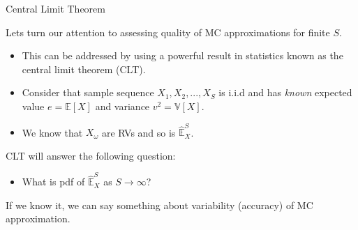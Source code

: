 \documentclass[9pt]{beamer}
\begin{document}
%
\begin{frame}{Central Limit Theorem}

Lets turn our attention to assessing quality of MC approximations for finite $S$. 
\begin{itemize}
\setlength{\itemsep}{10pt}
\item This can be addressed by using a powerful result in statistics known as the central limit theorem (CLT). 
\item Consider that sample sequence $X_1,X_2,...,X_S$ is i.i.d and has {\em known} expected value $e=\mathbb{E}[X]$ and variance $v^2=\mathbb{V}[X]$. 

\item We know that $X_\omega$ are RVs and so is $\hat{\mathbb{E}}_X^S$. 
\end{itemize}

CLT will answer the following question:
\begin{block}{}
\begin{itemize}
\item What is pdf of $\hat{\mathbb{E}}_X^S$ as $S\to \infty$?  
\end{itemize}
\end{block}
If we know it, we can say something about variability (accuracy) of MC  approximation. 

\end{frame}
\end{document}
